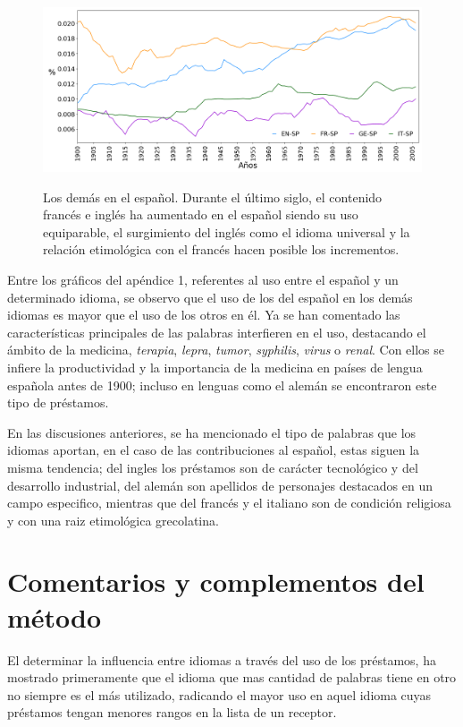 \begin{figure}[h!]
	\centering
	\includegraphics[scale=.36]{Cap_4/PF2_S2_SP.png}
	\label{fig.ST_b_SP}
	\caption{Los demás en el español.  Durante el último siglo, el contenido francés e inglés ha aumentado en el español siendo su uso equiparable, el surgimiento del inglés como el idioma universal y la relación etimológica con el francés  hacen posible los incrementos.}
\end{figure}

\clearpage

Entre los gráficos del apéndice 1, referentes al uso entre el español y un determinado idioma, se observo que el uso de los del español en los demás idiomas es mayor que el uso de los otros en él.  Ya se han comentado las características principales de las palabras interfieren en el uso, destacando el ámbito de la medicina, \textit{terapia}, \textit{lepra}, \textit{tumor}, \textit{syphilis}, \textit{virus} o \textit{renal}. Con ellos se infiere la productividad y la importancia de la medicina en países de lengua española antes de 1900; incluso en lenguas como el alemán se encontraron este tipo de préstamos. 


En las discusiones anteriores, se ha mencionado el tipo de palabras que los idiomas aportan,  en el caso de las contribuciones al español,   estas siguen la misma tendencia; del ingles los préstamos son de carácter tecnológico y del desarrollo industrial, del alemán son apellidos de personajes destacados en un campo especifico, mientras que del francés y el italiano son de condición religiosa y con una raiz etimológica grecolatina. 


\newpage
\section{Comentarios y complementos del método}


El determinar la influencia entre idiomas a través del uso de los préstamos, ha mostrado primeramente que el idioma que mas cantidad de palabras tiene en otro no siempre es el más utilizado,  radicando el mayor uso en aquel idioma cuyas préstamos tengan menores rangos en la lista de un receptor. 

